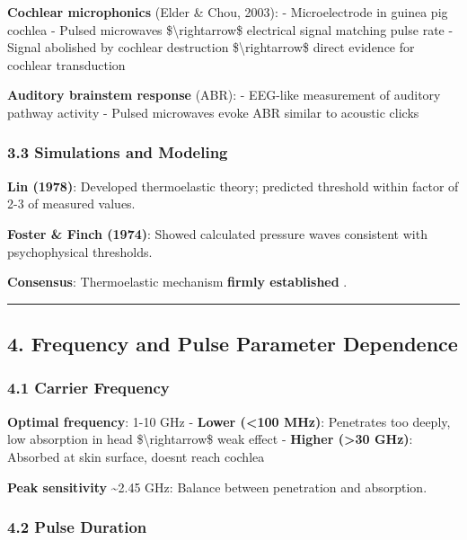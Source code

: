 \textbf{Cochlear microphonics} (Elder \& Chou, 2003): - Microelectrode
in guinea pig cochlea - Pulsed microwaves \$\textbackslash rightarrow\$
electrical signal matching pulse rate - Signal abolished by cochlear
destruction \$\textbackslash rightarrow\$ direct evidence for cochlear
transduction

\textbf{Auditory brainstem response} (ABR): - EEG-like measurement of
auditory pathway activity - Pulsed microwaves evoke ABR similar to
acoustic clicks

\subsubsection{3.3 Simulations and
Modeling}\label{simulations-and-modeling}

\textbf{Lin (1978)}: Developed thermoelastic theory; predicted threshold
within factor of 2-3 of measured values.

\textbf{Foster \& Finch (1974)}: Showed calculated pressure waves
consistent with psychophysical thresholds.

\textbf{Consensus}: Thermoelastic mechanism \textbf{firmly established}
.

\begin{center}\rule{0.5\linewidth}{0.5pt}\end{center}

\subsection{4. Frequency and Pulse Parameter
Dependence}\label{frequency-and-pulse-parameter-dependence}

\subsubsection{4.1 Carrier Frequency}\label{carrier-frequency}

\textbf{Optimal frequency}: 1-10 GHz - \textbf{Lower (\textless100
MHz)}: Penetrates too deeply, low absorption in head
\$\textbackslash rightarrow\$ weak effect - \textbf{Higher
(\textgreater30 GHz)}: Absorbed at skin surface, doesn\textquotesingle t
reach cochlea

\textbf{Peak sensitivity} \textasciitilde2.45 GHz: Balance between
penetration and absorption.

\subsubsection{4.2 Pulse Duration}\label{pulse-duration}

